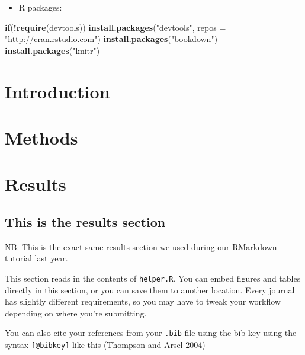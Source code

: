 \documentclass[
  12pt,
  oneside]{book}
\newenvironment{Shaded}{\begin{snugshade}}{\end{snugshade}}
\newcommand{\ControlFlowTok}[1]{\textcolor[rgb]{0.13,0.29,0.53}{\textbf{#1}}}
\newcommand{\DataTypeTok}[1]{\textcolor[rgb]{0.13,0.29,0.53}{#1}}
\newcommand{\KeywordTok}[1]{\textcolor[rgb]{0.13,0.29,0.53}{\textbf{#1}}}
\newcommand{\NormalTok}[1]{#1}
\newcommand{\OperatorTok}[1]{\textcolor[rgb]{0.81,0.36,0.00}{\textbf{#1}}}
\newcommand{\StringTok}[1]{\textcolor[rgb]{0.31,0.60,0.02}{#1}}
\providecommand{\tightlist}{%
  \setlength{\itemsep}{0pt}\setlength{\parskip}{0pt}}
\numberwithin{figure}{chapter}
\begin{document}
\begin{itemize}
\tightlist
\item
  R packages:
\end{itemize}

\begin{Shaded}
\begin{Highlighting}[]
\ControlFlowTok{if}\NormalTok{(}\OperatorTok{!}\KeywordTok{require}\NormalTok{(devtools))}
  \KeywordTok{install.packages}\NormalTok{(}\StringTok{"devtools"}\NormalTok{, }\DataTypeTok{repos =} \StringTok{"http://cran.rstudio.com"}\NormalTok{)}
\KeywordTok{install.packages}\NormalTok{(}\StringTok{"bookdown"}\NormalTok{)}
\KeywordTok{install.packages}\NormalTok{(}\StringTok{"knitr"}\NormalTok{)}
\end{Highlighting}
\end{Shaded}

\hypertarget{introduction}{%
\chapter{Introduction}\label{introduction}}

\hypertarget{methods}{%
\chapter{Methods}\label{methods}}

\hypertarget{results}{%
\chapter{Results}\label{results}}

\hypertarget{this-is-the-results-section}{%
\section{This is the results section}\label{this-is-the-results-section}}

NB: This is the exact same results section we used during our RMarkdown tutorial last year.

This section reads in the contents of \texttt{helper.R}. You can embed figures and tables directly in this section, or you can save them to another location. Every journal has slightly different requirements, so you may have to tweak your workflow depending on where you're submitting.

You can also cite your references from your \texttt{.bib} file using the bib key using the syntax \texttt{{[}@bibkey{]}} like this (Thompson and Arsel 2004)
\end{document}
